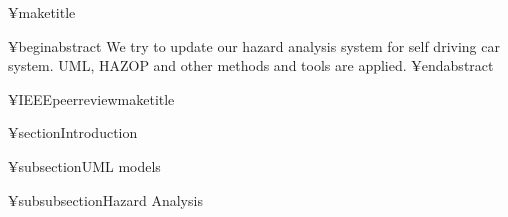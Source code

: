 

¥maketitle

¥begin{abstract}
We try to update our hazard analysis system for self driving car system.
UML, HAZOP and other methods and tools are applied.
¥end{abstract}





%
¥IEEEpeerreviewmaketitle


%

¥section{Introduction}



 

¥subsection{UML models}



¥subsubsection{Hazard Analysis}



%
%

